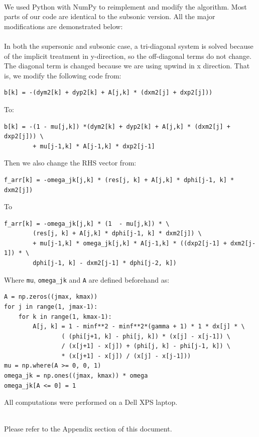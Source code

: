 \documentclass[12pt]{article}
\theoremstyle{definition}
\begin{document}
\\
We used Python with NumPy to reimplement and modify the algorithm. Most parts of our code are identical to the subsonic version. All the major modifications are demonstrated below:\\
\\
In both the supersonic and subsonic case, a tri-diagonal system is solved because of the implicit treatment in y-direction, so the off-diagonal terms do not change. The diagonal term is changed because we are using upwind in x direction. That is, we modify the following code from:
\begin{verbatim}
b[k] = -(dym2[k] + dyp2[k] + A[j,k] * (dxm2[j] + dxp2[j]))
\end{verbatim}
To:
\begin{verbatim}
b[k] = -(1 - mu[j,k]) *(dym2[k] + dyp2[k] + A[j,k] * (dxm2[j] + dxp2[j])) \
        + mu[j-1,k] * A[j-1,k] * dxp2[j-1]
\end{verbatim}
Then we also change the RHS vector from:
\begin{verbatim}
f_arr[k] = -omega_jk[j,k] * (res[j, k] + A[j,k] * dphi[j-1, k] * dxm2[j])
\end{verbatim}
To
\begin{verbatim}
f_arr[k] = -omega_jk[j,k] * (1  - mu[j,k]) * \
        (res[j, k] + A[j,k] * dphi[j-1, k] * dxm2[j]) \
        + mu[j-1,k] * omega_jk[j,k] * A[j-1,k] * ((dxp2[j-1] + dxm2[j-1]) * \
        dphi[j-1, k] - dxm2[j-1] * dphi[j-2, k])
\end{verbatim}
Where \texttt{mu}, \texttt{omega\_jk} and \texttt{A} are defined beforehand as:
\begin{verbatim}
A = np.zeros((jmax, kmax))
for j in range(1, jmax-1):
    for k in range(1, kmax-1):
        A[j, k] = 1 - minf**2 - minf**2*(gamma + 1) * 1 * dx[j] * \
                ( (phi[j+1, k] - phi[j, k]) * (x[j] - x[j-1]) \
                / (x[j+1] - x[j]) + (phi[j, k] - phi[j-1, k]) \
                * (x[j+1] - x[j]) / (x[j] - x[j-1]))
mu = np.where(A >= 0, 0, 1)
omega_jk = np.ones((jmax, kmax)) * omega
omega_jk[A <= 0] = 1
\end{verbatim}
All computations were performed on a Dell XPS laptop.  


\vspace{1cm}


\\
Please refer to the Appendix section of this document.\\
\end{document}
